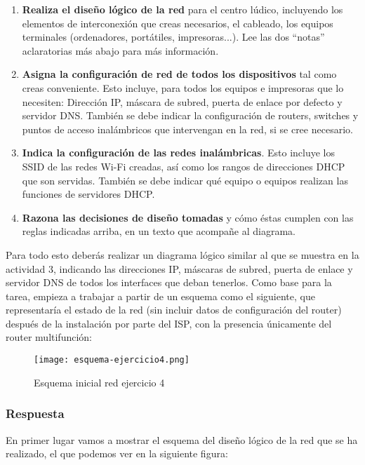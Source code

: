 \begin{enumerate}[label=(\alph*)]
        \item \textbf{Realiza el diseño lógico de la red} para el centro lúdico, incluyendo los elementos de interconexión que creas necesarios, el cableado, los equipos terminales (ordenadores, portátiles, impresoras...). Lee las dos ``notas'' aclaratorias más abajo para más información.
        \item \textbf{Asigna la configuración de red de todos los dispositivos} tal como creas conveniente. Esto incluye, para todos los equipos e impresoras que lo necesiten: Dirección IP, máscara de subred, puerta de enlace por defecto y servidor DNS. También se debe indicar la configuración de routers, switches y puntos de acceso inalámbricos que intervengan en la red, si se cree necesario.
        \item \textbf{Indica la configuración de las redes inalámbricas}. Esto incluye los SSID de las redes Wi-Fi creadas, así como los rangos de direcciones DHCP que son servidas. También se debe indicar qué equipo o equipos realizan las funciones de servidores DHCP.
        \item \textbf{Razona las decisiones de diseño tomadas} y cómo éstas cumplen con las reglas indicadas arriba, en un texto que acompañe al diagrama.
\end{enumerate}

Para todo esto deberás realizar un diagrama lógico similar al que se muestra en la actividad 3, indicando las direcciones IP, máscaras de subred, puerta de enlace y servidor DNS de todos los interfaces que deban tenerlos. Como base para la tarea, empieza a trabajar a partir de un esquema como el siguiente, que representaría el estado de la red (sin incluir datos de configuración del router) después de la instalación por parte del ISP, con la presencia únicamente del router multifunción:

\begin{figure}[ht]
    \centering
    \texttt{[image: esquema-ejercicio4.png]}
    \caption{Esquema inicial red ejercicio 4}
\end{figure}

\subsubsection{Respuesta}
En primer lugar vamos a mostrar el esquema del diseño lógico de la red que se ha realizado, el que podemos ver en la siguiente figura:

